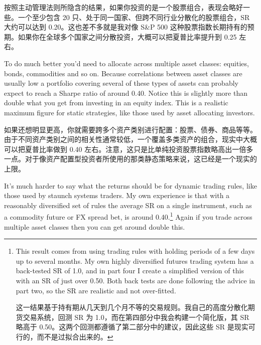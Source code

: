 \begin{chineseblock}按照主动管理法则所隐含的结果，如果你投资的是一个股票组合，表现会略好一些。一个至少包含 20 只、处于同一国家、但跨不同行业分散化的股票组合，SR 大约可以达到 0.20。这也差不多就是我对像 S\&P 500 这种股票指数长期持有的预期。如果你在全球多个国家之间分散投资，大概可以把夏普比率提升到 0.25 左右。\end{chineseblock}

\bipairgap

\begin{englishblock} To do much better you'd need to allocate across multiple asset classes: equities, bonds, commodities and so on. Because correlations between asset classes are usually low a portfolio covering several of these types of assets can probably expect to reach a Sharpe ratio of around 0.40. Notice this is slightly more than double what you get from investing in an equity index. This is a realistic maximum figure for static strategies, like those used by asset allocating investors. \end{englishblock}

\begin{chineseblock}如果还想明显更高，你就需要跨多个资产类别进行配置：股票、债券、商品等等。由于不同资产类别之间的相关性通常较低，一个覆盖多类资产的组合，现实中大概可以把夏普比率做到 0.40 左右。注意，这只是比单纯投资股票指数略高出一倍多一点。对于像资产配置型投资者所使用的那类静态策略来说，这已经是一个现实的上限。\end{chineseblock}

\bipairgap

\begin{englishblock} It's much harder to say what the returns should be for dynamic trading rules, like those used by staunch systems traders. My own experience is that with a reasonably diversified set of rules the average SR on a single instrument, such as a commodity future or FX spread bet, is around 0.40.\footnote{This result comes from using trading rules with holding periods of a few days up to several months. My own highly diversified futures trading system has a back-tested SR of 1.0, and in part four I create a simplified version of this with an SR of just over 0.50. Both back tests are done following the advice in part two, so the SR are realistic and not over-fitted. \par 这一结果基于持有期从几天到几个月不等的交易规则。我自己的高度分散化期货交易系统，回测 SR 为 1.0，而在第四部分中我会构建一个简化版，其 SR 略高于 0.50。这两个回测都遵循了第二部分中的建议，因此这些 SR 是现实可行的，而不是过拟合出来的。} Again if you trade across multiple asset classes then you can get around double this. \end{englishblock}

